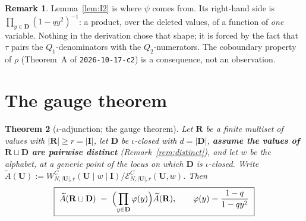 \documentclass[11pt]{article}
\newtheorem{thm}{Theorem}
\theoremstyle{definition}
\newtheorem{rem}[thm]{Remark}
\newcommand{\At}{\widetilde{A}}
\newcommand{\bI}{\mathbf{I}}
\newcommand{\bD}{\mathbf{D}}
\newcommand{\bU}{\mathbf{U}}
\newcommand{\bR}{\mathbf{R}}
\begin{document}
\begin{rem}
Lemma~\ref{lem:I2} is where $\psi$ comes from.  Its right-hand side is
$\prod_{y\in\bD}(1-qy^{2})^{-1}$: a product, over the deleted values, of a
function of \emph{one} variable.  Nothing in the derivation chose that shape; it
is forced by the fact that $\tau$ pairs the $Q_1$-denominators with the
$Q_2$-numerators.  The coboundary property of $\rho$ (Theorem~A of
\texttt{2026-10-17-c2}) is a consequence, not an observation.
\end{rem}

\section{The gauge theorem}
\label{sec:thm}

\begin{thm}[$\iota$-adjunction; the gauge theorem]\label{thm:gauge}
Let $\bR$ be a finite multiset of values with $|\bR|\ge r=|\bI|$, let $\bD$ be
$\iota$-closed with $d=|\bD|$, \textbf{assume the values of $\bR\sqcup\bD$ are
pairwise distinct} (Remark~\ref{rem:distinct}), and let $w$ be the alphabet, at a
generic point of the locus on which $\bD$ is $\iota$-closed.  Write
$\At(\bU):=W^{C}_{N,|\bU|,r}(\bU\mid w\mid\bI)/\mathcal{E}^{C}_{N,|\bU|,r}(\bU,w)$.
Then
\[
  \boxed{\ \At(\bR\sqcup\bD)\;=\;\Bigl(\prod_{y\in\bD}\varphi(y)\Bigr)\At(\bR),
  \qquad \varphi(y)=\frac{1-q}{1-qy^{2}}\ }
\]
\end{thm}
\end{document}
